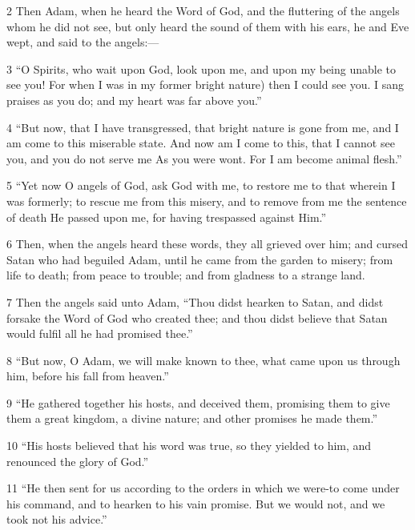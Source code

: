 \par 2 Then Adam, when he heard the Word of God, and the fluttering of the angels whom he did not see, but only heard the sound of them with his ears, he and Eve wept, and said to the angels:—

\par 3 “O Spirits, who wait upon God, look upon me, and upon my being unable to see you! For when I was in my former bright nature) then I could see you. I sang praises as you do; and my heart was far above you.”

\par 4 “But now, that I have transgressed, that bright nature is gone from me, and I am come to this miserable state. And now am I come to this, that I cannot see you, and you do not serve me As you were wont. For I am become animal flesh.”

\par 5 “Yet now O angels of God, ask God with me, to restore me to that wherein I was formerly; to rescue me from this misery, and to remove from me the sentence of death He passed upon me, for having trespassed against Him.”

\par 6 Then, when the angels heard these words, they all grieved over him; and cursed Satan who had beguiled Adam, until he came from the garden to misery; from life to death; from peace to trouble; and from gladness to a strange land.

\par 7 Then the angels said unto Adam, “Thou didst hearken to Satan, and didst forsake the Word of God who created thee; and thou didst believe that Satan would fulfil all he had promised thee.”

\par 8 “But now, O Adam, we will make known to thee, what came upon us through him, before his fall from heaven.”

\par 9 “He gathered together his hosts, and deceived them, promising them to give them a great kingdom, a divine nature; and other promises he made them.”

\par 10 “His hosts believed that his word was true, so they yielded to him, and renounced the glory of God.”

\par 11 “He then sent for us according to the orders in which we were-to come under his command, and to hearken to his vain promise. But we would not, and we took not his advice.”

